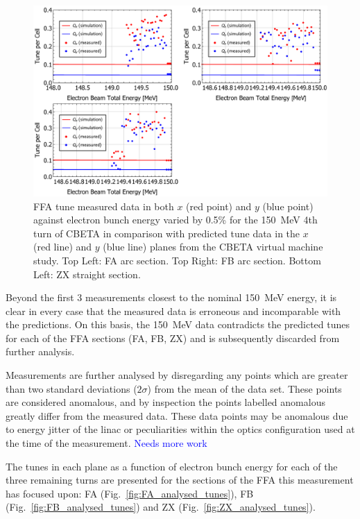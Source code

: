 \documentclass[../main.tex]{subfiles}
\begin{document}
\begin{figure}[!h]
\centering
\includegraphics[width=\textwidth]{Figures/CBETA_Multi-Pass_Commissioning/chromaticity/FAFBZX_150_tunes.pdf}
\caption{FFA tune measured data in both $x$ (red point) and $y$ (blue point) against electron bunch energy varied by 0.5\% for the 150~\si{\mega\electronvolt} 4th turn of CBETA in comparison with predicted tune data in the $x$ (red line) and $y$ (blue line) planes from the CBETA virtual machine study. Top Left: FA arc section. Top Right: FB arc section. Bottom Left: ZX straight section.}
\label{fig:FAFBZX_150_tunes}
\end{figure}

Beyond the first 3 measurements closest to the nominal 150~\si{\mega\electronvolt} energy, it is clear in every case that the measured data is erroneous and incomparable with the predictions. On this basis, the 150~\si{\mega\electronvolt} data contradicts the predicted tunes for each of the FFA sections (FA, FB, ZX) and is subsequently discarded from further analysis.

Measurements are further analysed by disregarding any points which are greater than two standard deviations ($2\sigma$) from the mean of the data set. These points are considered anomalous, and by inspection the points labelled anomalous greatly differ from the measured data. These data points may be anomalous due to energy jitter of the linac or peculiarities within the optics configuration used at the time of the measurement. \textcolor{blue}{Needs more work}

The tunes in each plane as a function of electron bunch energy for each of the three remaining turns are presented for the sections of the FFA this measurement has focused upon: FA (Fig.~\ref{fig:FA_analysed_tunes}), FB (Fig.~\ref{fig:FB_analysed_tunes}) and ZX (Fig.~\ref{fig:ZX_analysed_tunes}).
\end{document}
